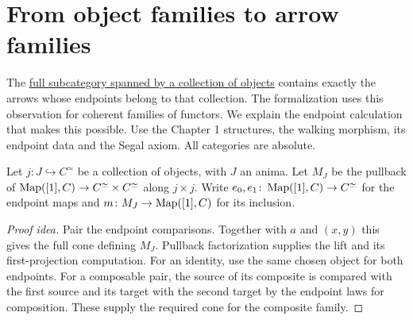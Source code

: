 \documentclass[11pt]{article}
\begin{document}
\section*{From object families to arrow families}

The \href{full-subcategories.html}{full subcategory spanned by a collection
of objects} contains exactly the arrows whose endpoints belong to that
collection. The formalization uses this observation for coherent families
of functors. We explain the endpoint calculation that makes this possible.
Use the Chapter 1 structures, the walking morphism, its endpoint data and
the Segal axiom. All categories are absolute.

Let $j\colon J\hookrightarrow C^\simeq$ be a collection of objects, with
$J$ an anima. Let $M_J$ be the pullback of
$\operatorname{Map}([1],C)\to C^\simeq\times C^\simeq$ along $j\times j$.
Write $e_0,e_1\colon\operatorname{Map}([1],C)\to C^\simeq$ for the endpoint maps and
$m\colon M_J\to\operatorname{Map}([1],C)$ for its inclusion.

\begin{proof}[Proof idea]
Pair the endpoint comparisons. Together with $a$ and $(x,y)$ this gives
the full cone defining $M_J$. Pullback factorization supplies the lift and
its first-projection computation.
For an identity, use the same chosen object for both endpoints.
For a composable pair, the source of its composite is compared with the
first source and its target with the second target by the endpoint laws
for composition. These supply the required cone for the composite family.
\end{proof}
\end{document}
